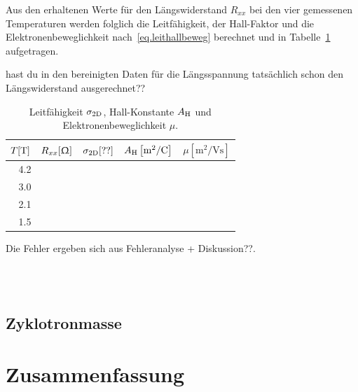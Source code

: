 \documentclass[paper=a4,fontsize=10pt,DIV=18,twocolumn,parskip=half]{scrartcl}
\numberwithin{equation}{section}    %
\newcommand{\note}[1]{{\color{red}#1??}}
\begin{document}
Aus den erhaltenen Werte für den Längswiderstand $R_{xx}$ bei den vier gemessenen Temperaturen werden folglich die Leitfähigkeit, der Hall-Faktor und die Elektronenbeweglichkeit nach~\eqref{eq.leithallbeweg} berechnet und in Tabelle~\ref{tab.leithallbeweg} aufgetragen.

\note{hast du in den bereinigten Daten für die Längsspannung tatsächlich schon den Längswiderstand ausgerechnet}

\begin{table}[htp]
	\begin{center}
		\begin{tabular}{rrrrr}
			\hline
			$T[\rm T]$ & $R_{xx}[\Upomega]$ & $\sigma_{\rm 2D}[\rm ??]$ & $A_{\rm H}\left[ \mathrm{m}^2/\mathrm{C} \right]$ & $\mu \left[ \mathrm{m}^2/\mathrm{Vs} \right]$\\
			\hline
			4.2 &&&&\\
			3.0 &&&&\\
			2.1 &&&&\\
			1.5 &&&&\\
			\hline
		\end{tabular}
		\caption{Leitfähigkeit $\sigma_{\rm 2D}$, Hall-Konstante $A_{\rm H}$ und Elektronenbeweglichkeit $\mu$.}
		\label{tab.leithallbeweg}
	\end{center}
\end{table}
Die Fehler ergeben sich aus \note{Fehleranalyse + Diskussion}.

%
~~~~~~~~~~~~~~~~~~~~~~~~~~~~~~~~~~~~~~~~~~~~~~~~~~~~~~~~~~~~~~~~~~~~~~~~~~~~~
\subsection{Zyklotronmasse}
\label{a4}
%
\section{Zusammenfassung}
\label{Zusammenfassung}
\end{document}
